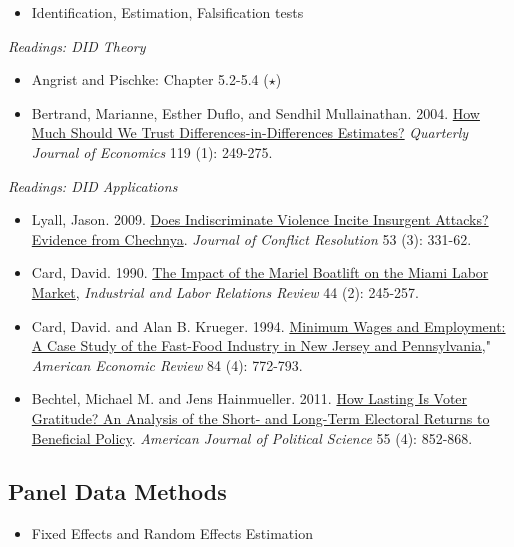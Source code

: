 \documentclass{article}
\begin{document}
\begin{itemize}
\item Identification, Estimation, Falsification tests
\end{itemize}

\emph{Readings: DID Theory}
\begin{itemize}
\item  Angrist and Pischke: Chapter 5.2-5.4 ($\star$)
\item Bertrand, Marianne, Esther Duflo, and Sendhil Mullainathan. 2004.  \href{http://qje.oxfordjournals.org/content/119/1/249.abstract} {How Much
Should We Trust Differences-in-Differences Estimates?} \textit{Quarterly Journal of
Economics} 119 (1): 249-275.
\end{itemize}

\emph{Readings: DID Applications}
\begin{itemize}
\item Lyall, Jason. 2009.  \href{http://www.jstor.org/stable/20684590} {Does Indiscriminate Violence Incite Insurgent Attacks?
Evidence from Chechnya}. \textit{Journal of Conflict Resolution} 53 (3): 331-62.
\item Card, David. 1990.  \href{http://www.jstor.org/stable/2523702} {The Impact of the Mariel Boatlift on the Miami Labor Market}, \textit{Industrial and Labor Relations Review} 44 (2): 245-257.
\item Card, David. and Alan B. Krueger. 1994.  \href{http://faculty.smu.edu/Millimet/classes/eco6352/papers/ck.pdf} {Minimum Wages and Employment: A Case Study
of the Fast-Food Industry in New Jersey and Pennsylvania}," \textit{American Economic
Review} 84 (4): 772-793.
\item Bechtel, Michael M. and Jens Hainmueller. 2011. \href{http://onlinelibrary.wiley.com/doi/10.1111/j.1540-5907.2011.00533.x/abstract} {How Lasting Is Voter Gratitude? An Analysis of the Short- and Long-Term Electoral Returns to Beneficial Policy}. \textit{American Journal of Political Science} 55 (4): 852-868.
\end{itemize}

\subsection{Panel Data Methods}

\begin{itemize}
\item Fixed Effects and Random Effects Estimation
\end{itemize}
\end{document}
